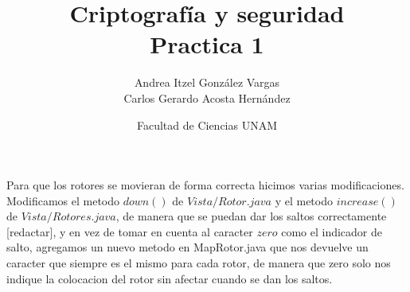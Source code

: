 \documentclass[12pt]{article}
\title{Criptografía y seguridad \\ Practica 1}
\author{Andrea Itzel González Vargas \\ Carlos Gerardo Acosta Hernández}
\date{Facultad de Ciencias UNAM}
\begin{document}
\maketitle
Para que los rotores se movieran de forma correcta hicimos varias modificaciones. Modificamos el metodo $down()$ de $Vista/Rotor.java$ y el metodo $increase()$ de $Vista/Rotores.java$, de manera que se puedan dar los saltos correctamente [redactar], y en vez de tomar en cuenta al caracter $zero$ como el indicador de salto, agregamos un nuevo metodo en MapRotor.java que nos devuelve un caracter que siempre es el mismo para cada rotor, de manera que zero solo nos indique la colocacion del rotor sin afectar cuando se dan los saltos.
\end{document}
